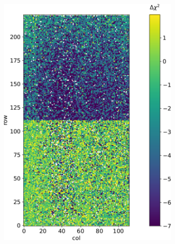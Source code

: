 \begin{figure}[h!]
\begin{subfigure}{.5\textwidth}
            \label{fig:delta_fit}
            \end{subfigure}
            \caption{}
        \end{figure}            

        \begin{figure}[h!]
            \begin{subfigure}{.5\textwidth}
            \centering
            \includegraphics[width=.9\linewidth]{figures/charaterization/deltachi2_Fe.pdf}
            \label{fig:}
            \end{subfigure}
            \begin{subfigure}{.5\textwidth}
            \centering

\end{subfigure}
\end{figure}
